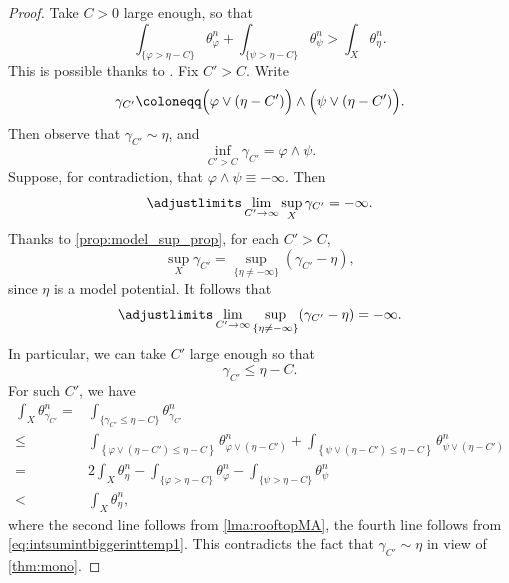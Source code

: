 \begin{proof}
    Take $C>0$ large enough, so that
    \begin{equation}\label{eq:intsumintbiggerinttemp1}
    \int_{\{\varphi>\eta-C\}} \theta_{\varphi}^n+\int_{\{\psi>\eta-C\}} \theta_{\psi}^n>\int_X \theta_{\eta}^n.
    \end{equation}
    This is possible thanks to .
    Fix $C'>C$.
    Write
    \[
    \gamma_{C'}\coloneqq \Bigl(\varphi\lor (\eta-C')\Bigr)\land \Bigl(\psi\lor (\eta-C')\Bigr).
    \]
    Then observe that $\gamma_{C'}\sim \eta$, and
    \[
    \inf_{C'>C}\gamma_{C'}=\varphi\land \psi.
    \]
    Suppose, for contradiction, that $\varphi\land\psi\equiv -\infty$. Then
    \[
    \adjustlimits\lim_{C'\to \infty} \sup_X\gamma_{C'}=-\infty.
    \]
    Thanks to \cref{prop:model_sup_prop}, for each $C'>C$,
    \[
    \sup_{X} \gamma_{C'}=\sup_{\{\eta\neq -\infty\}} (\gamma_{C'}-\eta),
    \]
    since $\eta$ is a model potential.
    It follows that
    \begin{equation}\label{eq:limsupgammametatemp1}
        \adjustlimits \lim_{C'\to \infty} \sup_{\{\eta\neq -\infty\}}  (\gamma_{C'}-\eta)=-\infty.
    \end{equation}
    In particular, we can take $C'$ large enough so that
    \[
    \gamma_{C'}\leq \eta-C.
    \]
    For such $C'$, we have
    \[
    \begin{aligned}
        \int_X \theta_{\gamma_{C'}}^n=&\int_{\{\gamma_{C'}\leq \eta-C\}} \theta_{\gamma_{C'}}^n \\
        \leq & \int_{\left\{\varphi\lor (\eta-C')\leq \eta-C\right\}} \theta_{\varphi\lor (\eta-C')}^n +\int_{\left\{\psi\lor (\eta-C')\leq \eta-C \right\}} \theta_{\psi\lor (\eta-C')}^n\\
        =& 2\int_X \theta_{\eta}^n-\int_{\{\varphi>\eta-C\}}\theta_{\varphi}^n-\int_{\{\psi>\eta-C\}}\theta_{\psi}^n\\
        <& \int_X \theta_{\eta}^n,
    \end{aligned}
    \]
    where the second line follows from \cref{lma:rooftopMA}, the fourth line follows from \eqref{eq:intsumintbiggerinttemp1}. This contradicts the fact that $\gamma_{C'}\sim \eta$ in view of \cref{thm:mono}.
\end{proof}

